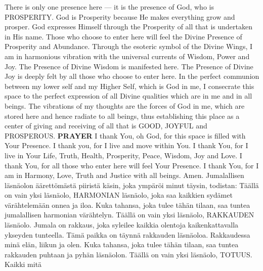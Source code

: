     \preceparspace
    There is only one presence here --- it is the
    presence of God, who is PROSPERITY. God is
    Prosperity because He makes everything grow and
    prosper. God expresses Himself through the
    Prosperity of all that is undertaken in His name.
    Those who choose to enter here will feel the
    Divine Presence of Prosperity and Abundance.
    \preceparspace
    Through the esoteric symbol of the Divine Wings,
    I am in harmonious vibration with the universal
    currents of Wisdom, Power and Joy. The Presence
    of Divine Wisdom is manifested here. The Presence
    of Divine Joy is deeply felt by all those who choose
    to enter here.
    \preceparspace
    In the perfect communion between my lower self and
    my Higher Self, which is God in me, I consecrate
    this space to the perfect expression of all Divine
    qualities which are in me and in all beings.
    \preceparspace
    The vibrations of my thoughts are the forces of God
    in me, which are stored here and hence radiate to
    all beings, thus establishing this place as a center
    of giving and receiving of all that is GOOD, JOYFUL
    and PROSPEROUS.
    \preceparspace
    \textbf{PRAYER}
    \preceparspace
    I thank You, oh God, for this space is filled with
    Your Presence.
    \preceparspace
    I thank you, for I live and move within You.
    \preceparspace
    I thank You, for I live in Your Life, Truth, Health,
    Prosperity, Peace, Wisdom, Joy and Love.
    \preceparspace
    I thank You, for all those who enter here will feel
    Your Presence.
    \preceparspace
    I thank You, for I am in Harmony, Love, Truth and
    Justice with all beings.
    \preceparspace
    Amen.
  \endverse
  \beginverse\color{finnishcolor}
    \preceparspace
    Jumalallisen läsnäolon äärettömästä piiristä käsin,
    joka ympäröi minut täysin, todistan:
    \preceparspace
    Täällä on vain yksi läsnäolo, HARMONIAN läsnäolo,
    joka saa kaikkien sydämet värähtelemään  onnea ja
    iloa. Kuka tahansa, joka tulee tähän tilaan, saa
    tuntea jumalallisen harmonian värähtelyn.
    \preceparspace
    Täällä on vain yksi läsnäolo, RAKKAUDEN läsnäolo.
    Jumala on rakkaus, joka syleilee kaikkia olentoja
    kaikenkattavalla ykseyden tunteella. Tämä paikka on
    täynnä rakkauden läsnäoloa. Rakkaudessa minä elän,
    liikun ja olen. Kuka tahansa, joka tulee tähän tilaan,
    saa tuntea rakkauden puhtaan ja pyhän läsnäolon.
    \preceparspace
    Täällä on vain yksi läsnäolo, TOTUUS. Kaikki mitä
